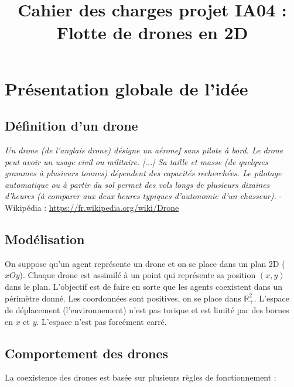 \documentclass[11pt]{report}
\begin{document}
\setcounter{secnumdepth}{3}
\setcounter{tocdepth}{3}
\title{Cahier des charges projet IA04 : Flotte de drones en 2D}
\date{}
\renewcommand{\thesection}{\arabic{section}}
\maketitle
\renewcommand{\contentsname}{\centering Sommaire}
\tableofcontents

\newpage
\section{Présentation globale de l'idée}
\subsection{Définition d'un drone}

\textit{Un drone (de l'anglais drone) désigne un aéronef sans pilote à bord. Le drone peut avoir un usage civil ou militaire. [...] Sa taille et masse (de quelques grammes à plusieurs tonnes) dépendent des capacités recherchées. Le pilotage automatique ou à partir du sol permet des vols longs de plusieurs dizaines d'heures (à comparer aux deux heures typiques d'autonomie d'un chasseur).} - Wikipédia :  \textcolor{blue}{\url{https://fr.wikipedia.org/wiki/Drone}}

\subsection{Modélisation}

On suppose qu'un agent représente un drone et on se place dans un plan 2D ($xOy$). Chaque drone est assimilé à un point qui représente sa position $(x, y)$ dans le plan. L'objectif est de faire en sorte que les agents coexistent dans un périmètre donné. Les coordonnées sont positives, on se place dans $\mathbb{R}^{2}_{+}$. L'espace de déplacement (l'environnement) n'est pas torique et est limité par des bornes en $x$ et $y$. L'espace n'est pas forcément carré.

\subsection{Comportement des drones}

La coexistence des drones est basée sur plusieurs règles de fonctionnement : 
\end{document}
